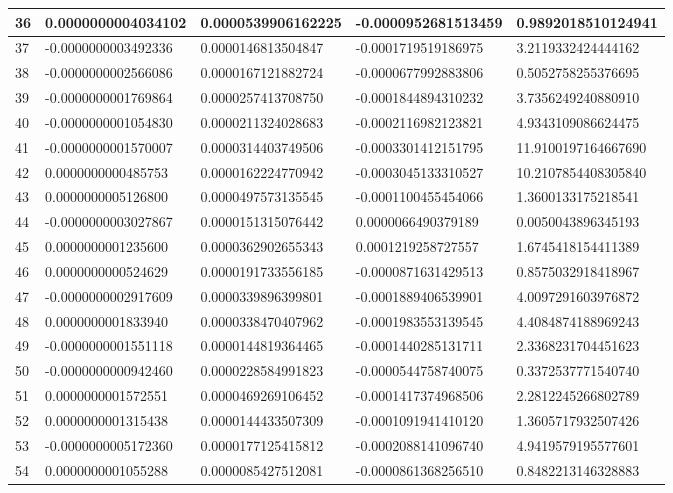 \begin{center}
\begin{longtable}{|p{0.5cm}|p{3.5cm}|p{3.5cm}|p{3.5cm}|p{3.5cm}|}
\hline
36  & 0.0000000004034102  & 0.0000539906162225  & -0.0000952681513459  & 0.9892018510124941\\
\hline
37  & -0.0000000003492336  & 0.0000146813504847  & -0.0001719519186975  & 3.2119332424444162\\
\hline
38  & -0.0000000002566086  & 0.0000167121882724  & -0.0000677992883806  & 0.5052758255376695\\
\hline
39  & -0.0000000001769864  & 0.0000257413708750  & -0.0001844894310232  & 3.7356249240880910\\
\hline
40  & -0.0000000001054830  & 0.0000211324028683  & -0.0002116982123821  & 4.9343109086624475\\
\hline
41  & -0.0000000001570007  & 0.0000314403749506  & -0.0003301412151795  & 11.9100197164667690\\
\hline
42  & 0.0000000000485753  & 0.0000162224770942  & -0.0003045133310527  & 10.2107854408305840\\
\hline
43  & 0.0000000005126800  & 0.0000497573135545  & -0.0001100455454066  & 1.3600133175218541\\
\hline
44  & -0.0000000003027867  & 0.0000151315076442  & 0.0000066490379189  & 0.0050043896345193\\
\hline
45  & 0.0000000001235600  & 0.0000362902655343  & 0.0001219258727557  & 1.6745418154411389\\
\hline
46  & 0.0000000000524629  & 0.0000191733556185  & -0.0000871631429513  & 0.8575032918418967\\
\hline
47  & -0.0000000002917609  & 0.0000339896399801  & -0.0001889406539901  & 4.0097291603976872\\
\hline
48  & 0.0000000001833940  & 0.0000338470407962  & -0.0001983553139545  & 4.4084874188969243\\
\hline
49  & -0.0000000001551118  & 0.0000144819364465  & -0.0001440285131711  & 2.3368231704451623\\
\hline
50  & -0.0000000000942460  & 0.0000228584991823  & -0.0000544758740075  & 0.3372537771540740\\
\hline
51  & 0.0000000001572551  & 0.0000469269106452  & -0.0001417374968506  & 2.2812245266802789\\
\hline
52  & 0.0000000001315438  & 0.0000144433507309  & -0.0001091941410120  & 1.3605717932507426\\
\hline
53  & -0.0000000005172360  & 0.0000177125415812  & -0.0002088141096740  & 4.9419579195577601\\
\hline
54  & 0.0000000001055288  & 0.0000085427512081  & -0.0000861368256510  & 0.8482213146328883\\

\end{longtable}
\end{center}

